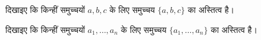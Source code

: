 \documentclass[../../../include/open-logic-section]{subfiles}
\begin{document}
\begin{prob}
दिखाइए कि किन्हीं समुच्चयों $a, b, c$ के लिए समुच्चय $\{a, b, c\}$ का
अस्तित्व है।
\end{prob}

\begin{prob}
दिखाइए कि किन्हीं समुच्चयों $a_1, \ldots, a_n$ के लिए समुच्चय
$\{a_1, \ldots, a_n\}$ का अस्तित्व है।
\end{prob}

\end{document}
